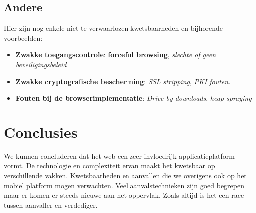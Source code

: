 \documentclass[../main.tex]{subfiles}
\begin{document}
\subsection{Andere}
Hier zijn nog enkele niet te verwaarlozen kwetsbaarheden en bijhorende voorbeelden:
\begin{itemize}
	\item \textbf{Zwakke toegangscontrole}: \textbf{forceful browsing}, \textit{slechte of geen beveiligingsbeleid}
	\item \textbf{Zwakke cryptografische bescherming}: \textit{SSL stripping}, \textit{PKI fouten}.
	\item \textbf{Fouten bij de browserimplementatie}: \textit{Drive-by-downloads}, \textit{heap spraying}
\end{itemize}

\section{Conclusies}
We kunnen concluderen dat het web een zeer invloedrijk applicatieplatform vormt. De technologie en complexiteit ervan maakt het kwetsbaar op verschillende vakken. Kwetsbaarheden en aanvallen die we overigens ook op het mobiel platform mogen verwachten. Veel aanvalstechnieken zijn goed begrepen maar er komen er steeds nieuwe aan het oppervlak. Zoals altijd is het een race tussen aanvaller en verdediger.
\end{document}
